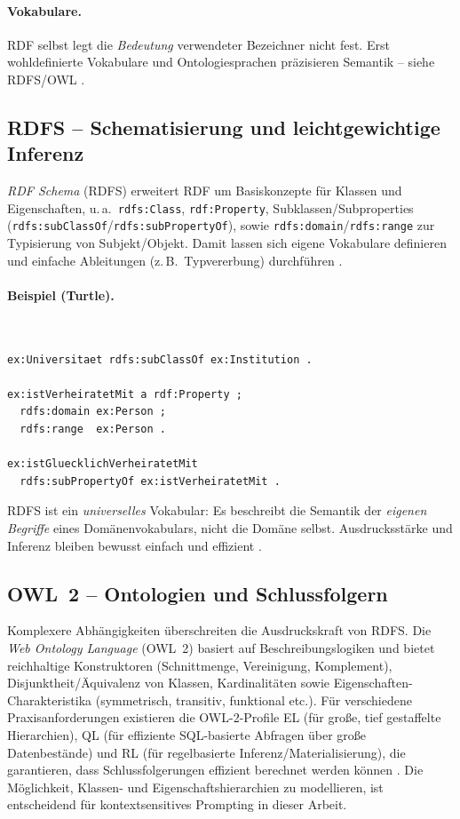 \paragraph{Vokabulare.} RDF selbst legt die \emph{Bedeutung} verwendeter Bezeichner nicht fest. Erst wohldefinierte Vokabulare und Ontologiesprachen präzisieren Semantik -- siehe RDFS/OWL \cite{Hitzler,AntoniouVanHarmelen}.



\subsection{RDFS -- Schematisierung und leichtgewichtige Inferenz}

\emph{RDF Schema} (RDFS) erweitert RDF um Basiskonzepte für Klassen und Eigenschaften, u.\,a.\ \texttt{rdfs:Class}, \texttt{rdf:Property}, Subklassen/Subproperties (\texttt{rdfs:subClassOf}/\texttt{rdfs:subPropertyOf}), sowie \texttt{rdfs:domain}/\texttt{rdfs:range} zur Typisierung von Subjekt/Objekt. Damit lassen sich eigene Vokabulare definieren und einfache Ableitungen (z.\,B.\ Typvererbung) durchführen \cite{RDFS11,Hitzler}.

\paragraph{Beispiel (Turtle).}\mbox{}\\[-1.5ex]
\begin{lstlisting}
ex:Universitaet rdfs:subClassOf ex:Institution .

ex:istVerheiratetMit a rdf:Property ;
  rdfs:domain ex:Person ;
  rdfs:range  ex:Person .

ex:istGluecklichVerheiratetMit
  rdfs:subPropertyOf ex:istVerheiratetMit .
\end{lstlisting}

RDFS ist ein \emph{universelles} Vokabular: Es beschreibt die Semantik der \emph{eigenen Begriffe} eines Domänenvokabulars, nicht die Domäne selbst. Ausdrucksstärke und Inferenz bleiben bewusst einfach und effizient \cite{RDFS11}.

\subsection{OWL~2 -- Ontologien und Schlussfolgern}
\label{subsec:owl}

Komplexere Abhängigkeiten überschreiten die Ausdruckskraft von RDFS. Die \emph{Web Ontology Language} (OWL~2) basiert auf Beschreibungslogiken und bietet reichhaltige Konstruktoren (Schnittmenge, Vereinigung, Komplement), Disjunktheit/Äquivalenz von Klassen, Kardinalitäten sowie Eigenschaften-Charakteristika (symmetrisch, transitiv, funktional etc.). Für verschiedene Praxisanforderungen existieren die OWL-2-Profile EL (für große, tief gestaffelte Hierarchien), QL (für effiziente SQL-basierte Abfragen über große Datenbestände) und RL (für regelbasierte Inferenz/Materialisierung), die garantieren, dass Schlussfolgerungen effizient berechnet werden können \cite{Hitzler,AntoniouVanHarmelen,OWL2Overview}. Die Möglichkeit, Klassen- und Eigenschaftshierarchien zu modellieren, ist entscheidend für kontextsensitives Prompting in dieser Arbeit.

